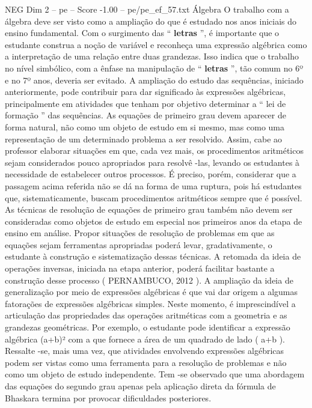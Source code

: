 \begin{textsample}{NEG Dim 2 – pe – Score -1.00 – pe/pe\_ef\_57.txt}  \label{ex:f2_neg_036}
Álgebra O trabalho com a álgebra deve ser visto como a ampliação do que é estudado nos anos iniciais do ensino fundamental.
Com o surgimento das “ \textbf{letras} ”, é importante que o estudante construa a noção de variável e reconheça uma expressão algébrica como a interpretação de uma relação entre duas grandezas.
Isso indica que o trabalho no nível simbólico, com a ênfase na manipulação de “ \textbf{letras} ”, tão comum no 6º e no 7º anos, deveria ser evitado.
A ampliação do estudo das sequências, iniciado anteriormente, pode contribuir para dar significado às expressões algébricas, principalmente em atividades que tenham por objetivo determinar a “ lei de formação ” das sequências.
As equações de primeiro grau devem aparecer de forma natural, não como um objeto de estudo em si mesmo, mas como uma representação de um determinado problema a ser resolvido.
Assim, cabe ao professor elaborar situações em que, cada vez mais, os procedimentos aritméticos sejam considerados pouco apropriados para resolvê -las, levando os estudantes à necessidade de estabelecer outros processos.
É preciso, porém, considerar que a passagem acima referida não se dá na forma de uma ruptura, pois há estudantes que, sistematicamente, buscam procedimentos aritméticos sempre que é possível.
As técnicas de resolução de equações de primeiro grau também não devem ser consideradas como objetos de estudo em especial nos primeiros anos da etapa de ensino em análise.
Propor situações de resolução de problemas em que as equações sejam ferramentas apropriadas poderá levar, gradativamente, o estudante à construção e sistematização dessas técnicas.
A retomada da ideia de operações inversas, iniciada na etapa anterior, poderá facilitar bastante a construção desse processo ( PERNAMBUCO, 2012 ).
A ampliação da ideia de generalização por meio de expressões algébricas é que vai dar origem a algumas fatorações de expressões algébricas simples.
Neste momento, é imprescindível a articulação das propriedades das operações aritméticas com a geometria e as grandezas geométricas.
Por exemplo, o estudante pode identificar a expressão algébrica (a+b)² com a que fornece a área de um quadrado de lado ( a+b ).
Ressalte -se, mais uma vez, que atividades envolvendo expressões algébricas podem ser vistas como uma ferramenta para a resolução de problemas e não como um objeto de estudo independente.
Tem -se observado que uma abordagem das equações do segundo grau apenas pela aplicação direta da fórmula de Bhaskara termina por provocar dificuldades posteriores.

\end{textsample}
